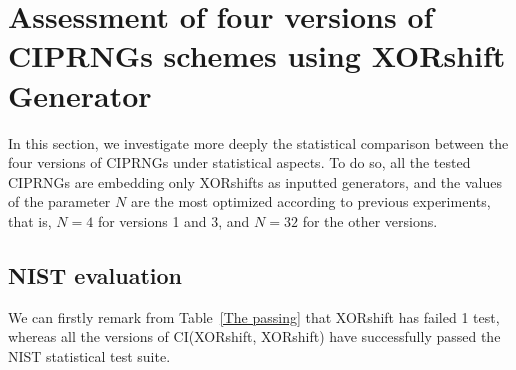 

\section{Assessment of four versions of CIPRNGs schemes using XORshift Generator}

In this section, we investigate more deeply 
the statistical comparison between the four 
versions of CIPRNGs under statistical aspects. 
To do so, all the tested CIPRNGs are embedding 
only XORshifts as inputted generators, and the values of the parameter $N$ are the most optimized according to previous experiments,
that is, $N=4$ for versions 1 and 3, and 
$N=32$ for the other versions.

\subsection{NIST evaluation}

We can firstly remark from Table~\ref{The passing} that XORshift has failed 1 test, whereas all
the versions of CI(XORshift, XORshift) have successfully passed the NIST statistical test suite. %

